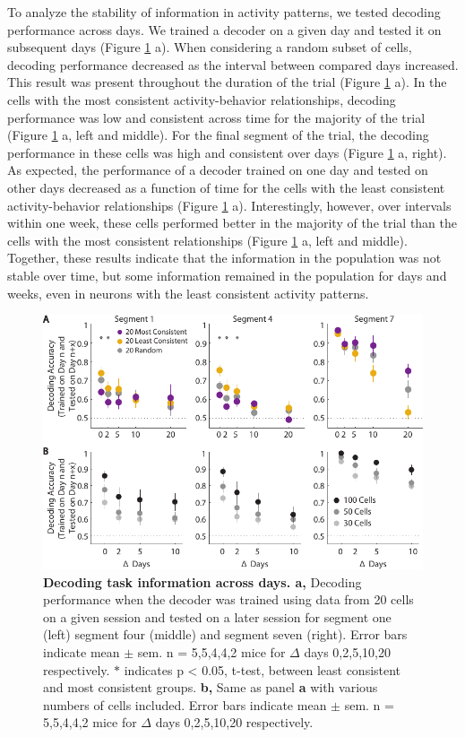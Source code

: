 To analyze the stability of information in activity patterns, we tested decoding performance across days. We trained a decoder on a given day and tested it on subsequent days (Figure \ref{fig:decoding_n} a). When considering a random subset of cells, decoding performance decreased as the interval between compared days increased. This result was present throughout the duration of the trial (Figure \ref{fig:decoding_n} a). In the cells with the most consistent activity-behavior relationships, decoding performance was low and consistent across time for the majority of the trial (Figure \ref{fig:decoding_n} a, left and middle). For the final segment of the trial, the decoding performance in these cells was high and consistent over days (Figure \ref{fig:decoding_n} a, right). As expected, the performance of a decoder trained on one day and tested on other days decreased as a function of time for the cells with the least consistent activity-behavior relationships (Figure \ref{fig:decoding_n} a). Interestingly, however, over intervals within one week, these cells performed better in the majority of the trial than the cells with the most consistent relationships (Figure \ref{fig:decoding_n} a, left and middle). Together, these results indicate that the information in the population was not stable over time, but some information remained in the population for days and weeks, even in neurons with the least consistent activity patterns.

\begin{figure}
\includegraphics[width=\textwidth]{figures/6_across_n.pdf}
\caption[Decoding task information across days.]{\textbf{Decoding task information across days. a,} Decoding performance when the decoder was trained using data from 20 cells on a given session and tested on a later session for segment one (left) segment four (middle) and segment seven (right). Error bars indicate mean $\pm$ sem. n = 5,5,4,4,2 mice for $\Delta$ days 0,2,5,10,20 respectively. $*$ indicates p < 0.05, t-test, between least consistent and most consistent groups.
%
\textbf{b,} Same as panel \textbf{a} with various numbers of cells included. Error bars indicate mean $\pm$ sem. n = 5,5,4,4,2 mice for $\Delta$ days 0,2,5,10,20 respectively. 
\label{fig:decoding_n}}
\end{figure}

